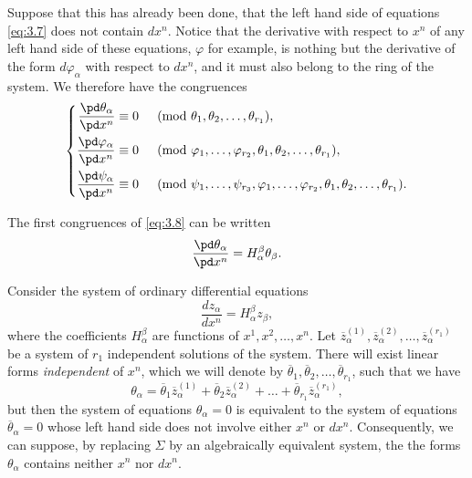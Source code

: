 Suppose that this has already been done, that the left hand side of equations \eqref{eq:3.7} does not contain $dx^{n}$.  Notice that the derivative with respect to $x^{n}$ of any left hand side of these equations, $\varphi$ for example, is nothing but the derivative of the form $d\varphi_{\alpha}$ with respect to $dx^{n}$, and  it must also belong to the ring of the system. We therefore have the congruences
\begin{equation}
  \label{eq:3.8}
  \left\{
    \begin{aligned}
      \frac{\pd \theta_{\alpha}}{\pd x^{n}}&\equiv 0&&\pmod{\theta_{1},\theta_{2},\dots,\theta_{r_{1}}},\\
      \frac{\pd \varphi_{\alpha}}{\pd x^{n}}&\equiv 0&&\pmod{\varphi_{1},\dots,\varphi_{r_{2}},\theta_{1},\theta_{2},\dots,\theta_{r_{1}}},\\
      \frac{\pd \psi_{\alpha}}{\pd x^{n}}&\equiv 0&&\pmod{\psi_{1},\dots,\psi_{r_{3}},\varphi_{1},\dots,\varphi_{r_{2}},\theta_{1},\theta_{2},\dots,\theta_{r_{1}}}.
    \end{aligned}
  \right.
\end{equation}

The first congruences of \eqref{eq:3.8} can be written
\begin{equation}
  \label{eq:3.9}
  \frac{\pd \theta_{\alpha}}{\pd x^{n}}=H_{\alpha}^{\beta}\theta_{\beta}.
\end{equation}

Consider the system of ordinary differential equations
\begin{equation}
  \label{eq:3.10}
  \frac{dz_{\alpha}}{dx^{n}}=H^{\beta}_{\alpha}z_{\beta},
\end{equation}
where the coefficients $H_{\alpha}^{\beta}$ are functions of $x^{1},x^{2},\dots,x^{n}$. Let $\overline z^{(1)}_{\alpha},\overline z^{(2)}_{\alpha},\dots,\overline z^{(r_{1})}_{\alpha}$ be a system of $r_{1}$ independent solutions of the system. There will exist linear forms \emph{independent} of $x^{n}$, which we will denote by $\overline\theta_{1},\overline\theta_{2},\dots,\overline\theta_{r_{1}}$, such that we have
\[
\theta_{\alpha}=\overline\theta_{1}\overline z^{(1)}_{\alpha}+\overline\theta_{2}\overline z^{(2)}_{\alpha}+\dots+\overline\theta_{r_{1}}\overline z^{(r_{1})}_{\alpha},
\]
but then the system of equations $\theta_{\alpha}=0$ is equivalent to the system of equations $\overline\theta_{\alpha}=0$ whose left hand side does not involve either $x^{n}$ or $dx^{n}$. Consequently, we can suppose, by replacing $\Sigma$ by an algebraically equivalent system, the the forms $\theta_{\alpha}$ contains neither $x^{n}$ nor $dx^{n}$.


